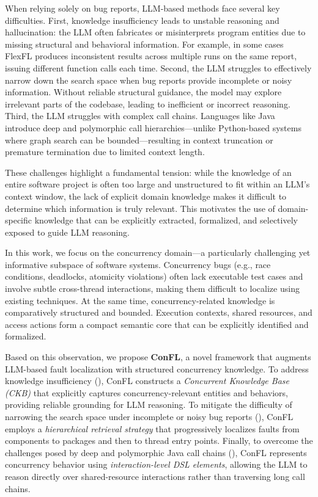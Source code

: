 When relying solely on bug reports, LLM-based methods face several key difficulties.
 First, knowledge insufficiency leads to unstable reasoning and hallucination: the LLM often fabricates or misinterprets program entities due to missing structural and behavioral information.
For example, in some cases FlexFL produces inconsistent results across multiple runs on the same report, issuing different function calls each time.
 Second, the LLM struggles to effectively narrow down the search space when bug reports provide incomplete or noisy information.
Without reliable structural guidance, the model may explore irrelevant parts of the codebase, leading to inefficient or incorrect reasoning.
 Third, the LLM struggles with complex call chains.
Languages like Java introduce deep and polymorphic call hierarchies—unlike Python-based systems where graph search can be bounded—resulting in context truncation or premature termination due to limited context length.

These challenges highlight a fundamental tension: while the knowledge of an entire software project is often too large and unstructured to fit within an LLM’s context window, the lack of explicit domain knowledge makes it difficult to determine which information is truly relevant.
This motivates the use of domain-specific knowledge that can be explicitly extracted, formalized, and selectively exposed to guide LLM reasoning.

In this work, we focus on the concurrency domain—a particularly challenging yet informative subspace of software systems.
Concurrency bugs (e.g., race conditions, deadlocks, atomicity violations) often lack executable test cases and involve subtle cross-thread interactions, making them difficult to localize using existing techniques.
At the same time, concurrency-related knowledge is comparatively structured and bounded.
Execution contexts, shared resources, and access actions form a compact semantic core that can be explicitly identified and formalized.

Based on this observation, we propose \textbf{ConFL}, a novel framework that augments LLM-based fault localization with structured concurrency knowledge.
To address knowledge insufficiency (), ConFL constructs a \emph{Concurrent Knowledge Base (CKB)} that explicitly captures concurrency-relevant entities and behaviors, providing reliable grounding for LLM reasoning.
To mitigate the difficulty of narrowing the search space under incomplete or noisy bug reports (), ConFL employs a \emph{hierarchical retrieval strategy} that progressively localizes faults from components to packages and then to thread entry points.
Finally, to overcome the challenges posed by deep and polymorphic Java call chains (), ConFL represents concurrency behavior using \emph{interaction-level DSL elements}, allowing the LLM to reason directly over shared-resource interactions rather than traversing long call chains.

